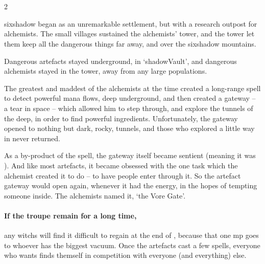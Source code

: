 
\section[\Glsfmttext{shadowVault}]{}
\label{shadowVault}


\begin{multicols}{2}


\begin{exampletext}
  \noindent
  \Gls{sixshadow} began as an unremarkable settlement, but with a research outpost for alchemists.
  The small \glspl{village} sustained the alchemists' tower, and the tower let them keep all the dangerous things far away, and over the \gls{sixshadow} mountains.

  Dangerous \glspl{artefact} stayed underground, in `\gls{shadowVault}', and dangerous alchemists stayed in the tower, away from any large populations.

  The greatest and maddest of the alchemists at the time created a long-range spell to detect powerful mana flows, deep underground, and then created a gateway -- a tear in space -- which allowed him to step through, and explore the tunnels of the \gls{deep}, in order to find powerful \glspl{ingredient}.
  Unfortunately, the gateway opened to nothing but dark, rocky, tunnels, and those who explored a little way in never returned.

  As a by-product of the spell, the gateway itself became sentient (meaning it was ).
  And like most \glspl{artefact}, it became obsessed with the one task which the alchemist created it to do -- to have people enter through it.
  So the \gls{artefact} gateway would open again, whenever it had the energy, in the hopes of tempting someone inside.
  The alchemists named it, `the Vore Gate'.
\end{exampletext}

\paragraph{If the troupe remain for a long time,}
any \glspl{witch} will find it difficult to regain  at the end of , because that one \gls{mp} goes to whoever has the biggest vacuum.
Once the \glspl{artefact} cast a few spells, everyone who wants  finds themself in competition with everyone (and everything) else.


\end{multicols}
